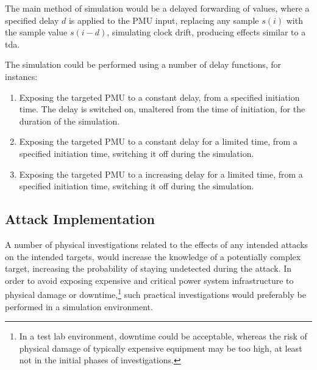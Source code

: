 The main method of simulation would be a delayed forwarding of values, where a specified delay $d$ is applied to the PMU input, replacing any sample $s(i)$ with the sample value $s(i-d)$, simulating clock drift, producing effects similar to a \acrlong{tda}.

The simulation could be performed using a number of delay functions, for instancs:
\begin{enumerate}
   
\item  Exposing the targeted PMU to a constant delay, from a specified initiation time.
    The delay is switched on, unaltered from the time of initiation, for the duration of the simulation. 
\item  Exposing the targeted PMU to a constant delay for a limited time, from a specified initiation time, switching it off during the simulation.  
\item  Exposing the targeted PMU to a increasing delay for a limited time, from a specified initiation time, switching it off during the simulation.   
\end{enumerate}
    


\subsection{Attack Implementation}








A number of physical investigations related to the effects of any intended attacks on the intended targets, would increase the knowledge of a potentially complex target, increasing the probability of staying undetected during the attack. In order to avoid exposing expensive and critical power system infrastructure to physical damage or downtime,\footnote{In a test lab environment, downtime could be acceptable, whereas the risk of physical damage of typically expensive equipment may be too high, at least not in the initial phases of investigations.} such practical investigations would preferably be performed in a simulation environment.

